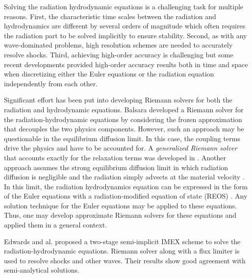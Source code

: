 \documentclass[review]{elsarticle}
\begin{document}
Solving the radiation hydrodynamic equations is a challenging task for multiple reasons. First, the characteristic time scales between the radiation and hydrodynamics are different by several orders of magnitude which often requires the radiation part to be solved implicitly to ensure stability. Second, as with any wave-dominated problems, high resolution schemes are needed to accurately resolve shocks. Third, achieving high-order accuracy is challenging but some recent developments provided high-order accuracy results both in time and space when discretizing either the Euler equations \cite{Hussaini, jlg1, jlg2, Leveque} or the radiation equation independently from each other. 

Significant effort has been put into developing Riemann solvers for both the radiation and hydrodynamic equations. Balsara \cite{Balsara} developed a Riemann solver for the radiation-hydrodynamic equations by considering the frozen approximation that decouples the two physics components. However, such an approach may be questionable in the equilibrium diffusion limit. In this case, the coupling terms drive the physics and have to be accounted for. A \emph{generalized Riemann solver} that accounts exactly for the relaxation terms was developed in \cite{Balsara}. Another approach assumes the strong equilibrium diffusion limit in which radiation diffusion is negligible and the radiation simply advects at the material velocity \cite{Woodward}. In this limit, the radiation hydrodynamics equation can be expressed in the form of the Euler equations with a radiation-modified equation of state (REOS) . Any solution technique for the Euler equations may be applied to these equations. Thus, one may develop approximate Riemann solvers for these equations and applied them in a general context. 

Edwards and al. \cite{EdwardsMorelLowrie} proposed a two-stage semi-implicit IMEX scheme to solve the radiation-hydrodynamic equations. Riemann solver along with a flux limiter is used to resolve shocks and other waves. Their results show good agreement with semi-analytical solutions. 
\end{document}
